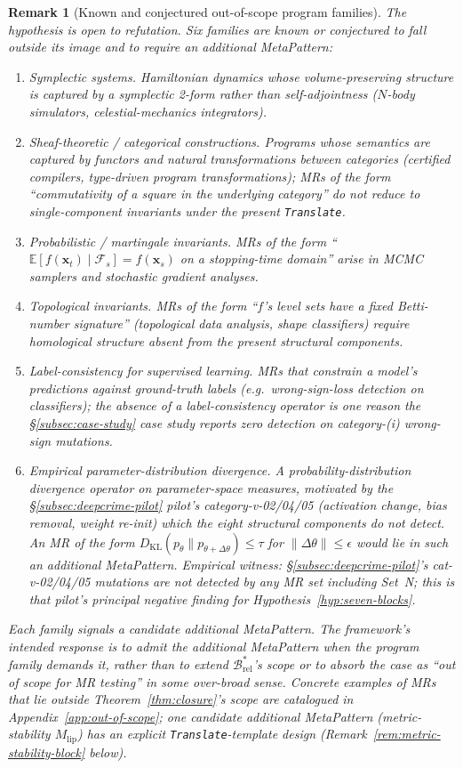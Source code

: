 \documentclass[acmsmall,screen,review]{acmart}
\newtheorem{remark}{Remark}
\begin{document}
\begin{remark}[Known and conjectured out-of-scope program families]
\label{rem:counterex}
The hypothesis is open to refutation. Six families are known or conjectured to fall outside its image and to require an additional MetaPattern:
\begin{enumerate}
\item \emph{Symplectic systems.} Hamiltonian dynamics whose volume-preserving structure is captured by a symplectic 2-form rather than self-adjointness ($N$-body simulators, celestial-mechanics integrators).
\item \emph{Sheaf-theoretic / categorical constructions.} Programs whose semantics are captured by functors and natural transformations between categories (certified compilers, type-driven program transformations); MRs of the form ``commutativity of a square in the underlying category'' do not reduce to single-component invariants under the present \texttt{Translate}.
\item \emph{Probabilistic / martingale invariants.} MRs of the form ``$\mathbb{E}[f(\mathbf{x}_t) \mid \mathcal{F}_s] = f(\mathbf{x}_s)$ on a stopping-time domain'' arise in MCMC samplers and stochastic gradient analyses.
\item \emph{Topological invariants.} MRs of the form ``$f$'s level sets have a fixed Betti-number signature'' (topological data analysis, shape classifiers) require homological structure absent from the present structural components.
\item \emph{Label-consistency for supervised learning.} MRs that constrain a model's predictions against ground-truth labels (e.g.\ wrong-sign-loss detection on classifiers); the absence of a label-consistency operator is one reason the §\ref{subsec:case-study} case study reports zero detection on category-(i) wrong-sign mutations.
\item \emph{Empirical parameter-distribution divergence.} A probability-distribution divergence operator on parameter-space measures, motivated by the §\ref{subsec:deepcrime-pilot} pilot's category-v-02/04/05 (activation change, bias removal, weight re-init) which the eight structural components do not detect. An MR of the form $D_{\mathrm{KL}}(p_\theta \| p_{\theta+\Delta\theta}) \le \tau$ for $\|\Delta\theta\| \le \epsilon$ would lie in such an additional MetaPattern. \emph{Empirical witness}: \S\ref{subsec:deepcrime-pilot}'s cat-v-02/04/05 mutations are not detected by any MR set including Set~N; this is that pilot's principal negative finding for Hypothesis~\ref{hyp:seven-blocks}.
\end{enumerate}
Each family signals a candidate additional MetaPattern. The framework's intended response is to admit the additional MetaPattern when the program family demands it, rather than to extend $\mathcal{B}^{*}_{\mathrm{rel}}$'s scope or to absorb the case as ``out of scope for MR testing'' in some over-broad sense. Concrete examples of MRs that lie outside Theorem~\ref{thm:closure}'s scope are catalogued in Appendix~\ref{app:out-of-scope}; one candidate additional MetaPattern (metric-stability $M_{\mathrm{lip}}$) has an explicit \texttt{Translate}-template design (Remark~\ref{rem:metric-stability-block} below).
\end{remark}
\end{document}
